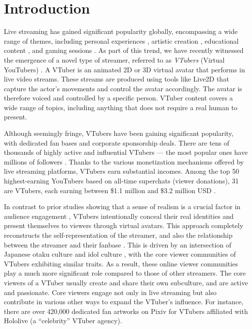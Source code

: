 \section{Introduction}

Live streaming has gained significant popularity globally, encompassing a wide range of themes, including personal experiences \cite{lottridge2017thirdwave, lu2019vicariously, tang2016meerkat}, artistic creation \cite{fraser2019sharing, lu2019responsibility}, educational content \cite{lu2018watch, faas2018watch, lu2018streamwiki}, and gaming sessions \cite{hamilton2014streaming, 7382994}. 
As part of this trend, we have recently witnessed the emergence of a novel type of streamer, referred to as \emph{VTubers} (Virtual YouTubers) \cite{lu2021kawaii}. 
A VTuber is an animated 2D or 3D virtual avatar that performs in live video streams.
These streams are produced using tools like Live2D \cite{Live2D} that capture the actor's movements and control the avatar accordingly.
The avatar is therefore voiced and controlled by a specific person.
VTuber content covers a wide range of topics, including anything that does not require a real human to present.


Although seemingly fringe, VTubers have been gaining significant popularity, with dedicated fan bases and corporate sponsorship deals.
There are tens of thousands of highly active and influential VTubers --- the most popular ones have millions of followers \cite{vtb-fan-ranking}.
Thanks to the various monetization mechanisms offered by live streaming platforms, VTubers earn substantial incomes. 
Among the top 50 highest-earning YouTubers based on all-time superchats (viewer donations), 31 are VTubers, each earning between \$1.1 million and \$3.2 million USD \cite{vtb-superchat-ranking}. 

In contrast to prior studies showing that a sense of realism is a crucial factor in audience engagement \cite{tang2017crowdcasting, haimson2017live}, VTubers intentionally conceal their real identities and present themselves to viewers through virtual avatars.
This approach completely reconstructs the self-representation \cite{10.1145/3637357, doi:10.1080/10510974.2024.2337955} of the streamer, and also the relationship between the streamer and their fanbase \cite{Xu_Niu_2023, lu2021kawaii, Turner1676326, 10058945}. This is driven by an intersection of Japanese otaku culture and idol culture \cite{lu2021kawaii, 10.1145/3604479.3604523}, with the core viewer communities of VTubers exhibiting similar traits. As a result, these online viewer communities play a much more significant role compared to those of other streamers. The core viewers of a VTuber usually create and share their own subculture, and are active and passionate. Core viewers engage not only in live streaming but also contribute in various other ways to expand the VTuber's influence. For instance, there are over 420,000 dedicated fan artworks on Pixiv \cite{pixiv-hololive,wei2024understanding} for VTubers affiliated with Hololive (a ``celebrity'' VTuber agency). 


